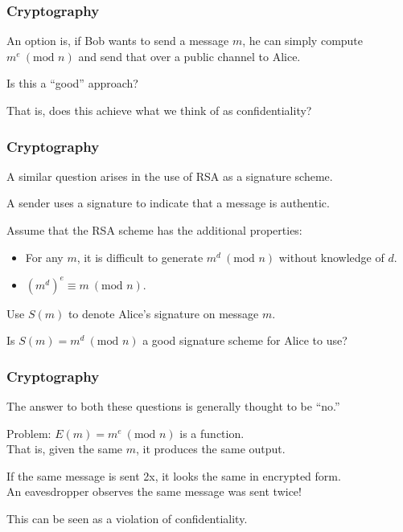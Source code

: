 \begin{frame}
\frametitle{Cryptography}
\begin{changemargin}{1cm}

An option is, if Bob wants to send a message $m$, he can simply compute
$m^e~(\text{mod } n)$ and send that over a public channel to Alice.


Is this a ``good'' approach?

That is, does this achieve what we think of as confidentiality?

\end{changemargin}
\end{frame}

\begin{frame}
\frametitle{Cryptography}
\begin{changemargin}{1cm}

A similar question arises in the use of RSA as a signature scheme.

A sender uses a \alert{signature} to indicate that a message is authentic.

Assume that the RSA scheme has the additional properties:
\begin{itemize}
    \item For any $m$, it is difficult to generate $m^d~(\text{mod } n)$ without
	knowledge of $d$.
    \item $\left(m^d\right)^e \equiv m~(\text{mod } n)$.
\end{itemize}

Use $S(m)$ to denote Alice's signature on message $m$.

Is $S(m) = m^d~(\text{mod } n)$ a good signature scheme for Alice to use?

\end{changemargin}
\end{frame}

\begin{frame}
\frametitle{Cryptography}
\begin{changemargin}{1cm}

The answer to both these questions is generally thought to be ``no.'' 

Problem: $E(m) = m^e~(\text{mod } n)$ is a function.\\
\quad That is, given the same $m$, it produces the same output. 

If the same message is sent 2x, it looks the same in encrypted form.\\
\quad An eavesdropper observes the same message was sent twice!

This can be seen as a violation of confidentiality.

\end{changemargin}
\end{frame}

